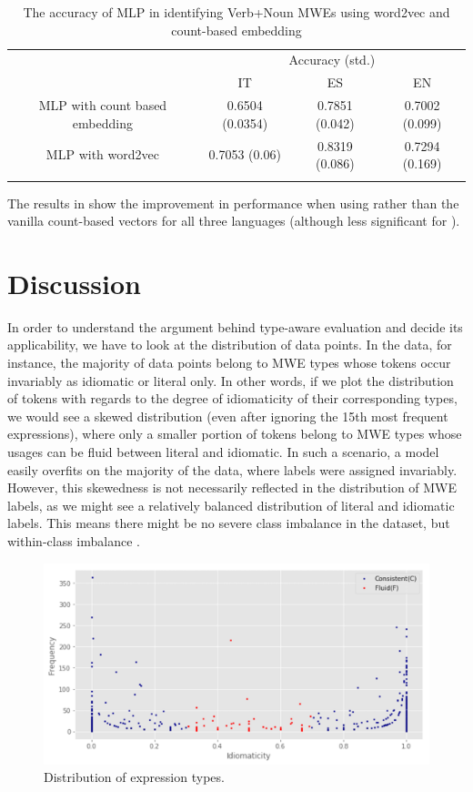 \documentclass[output=paper,modfonts,nonflat]{langsci/langscibook}
\begin{document}
\begin{table}[!ht]
\small
\caption{The accuracy of MLP in identifying Verb+Noun MWEs using word2vec and count-based embedding}
\label{tab:wv}
 \begin{tabular}{cccc}
  \lsptoprule
  & \multicolumn{3}{c}{Accuracy (std.)} \\
  & IT & ES & EN \\
  \midrule
  MLP with count based embedding & 0.6504 (0.0354) & 0.7851 (0.042)  & 0.7002 (0.099) \\
  MLP with word2vec & 0.7053 (0.06) &   0.8319 (0.086) & 0.7294 (0.169) \\
  \lspbottomrule
 \end{tabular}
\end{table}

The results in  show the improvement in performance when using  rather than the vanilla count-based vectors for all three languages (although less significant for ). 
 
\section{Discussion}

In order to understand the argument behind type-aware evaluation and decide its applicability, we have to look at the distribution of data points. In the  data, for instance, the majority of data points belong to MWE types whose tokens occur invariably as idiomatic or literal only. In other words, if we plot the distribution of tokens with regards to the degree of idiomaticity of their corresponding types, we would see a skewed distribution (even after ignoring the 15th most frequent expressions), where only a smaller portion of tokens belong to MWE types whose usages can be fluid between literal and idiomatic. In such a scenario, a model easily overfits on the majority of the data, where labels were assigned invariably. However, this skewedness is not necessarily reflected in the distribution of MWE labels, as we might see a relatively balanced distribution of literal and idiomatic labels. This means there might be no severe class imbalance in the dataset, but within-class imbalance \citep{ali2015classification}.

\begin{figure}[!htb]
\includegraphics[scale=0.45]{figures/data_imbalance.png} 
\caption{Distribution of expression types.}
\label{fig:data}
\end{figure}
\end{document}
